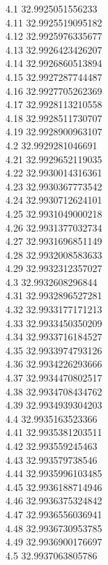 {4.1	32.9925051556233\\
4.11	32.9925519095182\\
4.12	32.9925976335677\\
4.13	32.9926423426207\\
4.14	32.9926860513894\\
4.15	32.9927287744487\\
4.16	32.9927705262369\\
4.17	32.9928113210558\\
4.18	32.9928511730707\\
4.19	32.9928900963107\\
4.2	32.9929281046691\\
4.21	32.9929652119035\\
4.22	32.9930014316361\\
4.23	32.9930367773542\\
4.24	32.9930712624101\\
4.25	32.9931049000218\\
4.26	32.9931377032734\\
4.27	32.9931696851149\\
4.28	32.9932008583633\\
4.29	32.9932312357027\\
4.3	32.9932608296844\\
4.31	32.9932896527281\\
4.32	32.9933177171213\\
4.33	32.9933450350209\\
4.34	32.9933716184527\\
4.35	32.9933974793126\\
4.36	32.9934226293666\\
4.37	32.9934470802517\\
4.38	32.9934708434762\\
4.39	32.9934939304203\\
4.4	32.9935163523366\\
4.41	32.9935381203511\\
4.42	32.993559245463\\
4.43	32.993579738546\\
4.44	32.9935996103485\\
4.45	32.9936188714946\\
4.46	32.9936375324842\\
4.47	32.9936556036941\\
4.48	32.9936730953785\\
4.49	32.9936900176697\\
4.5	32.9937063805786\\
}
